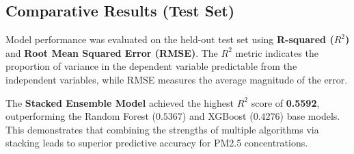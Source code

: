 \documentclass[conference]{IEEEtran}
\begin{document}
\subsection{Comparative Results (Test Set)}
Model performance was evaluated on the held-out test set using \textbf{R-squared ($R^2$)} and \textbf{Root Mean Squared Error (RMSE)}. The $R^2$ metric indicates the proportion of variance in the dependent variable predictable from the independent variables, while RMSE measures the average magnitude of the error.

\begin{table}[htbp]
    \caption{Comparative Performance Metrics on Test Set}
    \label{tab:results}
    \centering
\end{table}



The \textbf{Stacked Ensemble Model} achieved the highest $R^2$ score of \textbf{0.5592}, outperforming the Random Forest ($0.5367$) and XGBoost ($0.4276$) base models. This demonstrates that combining the strengths of multiple algorithms via stacking leads to superior predictive accuracy for PM2.5 concentrations.
\end{document}
